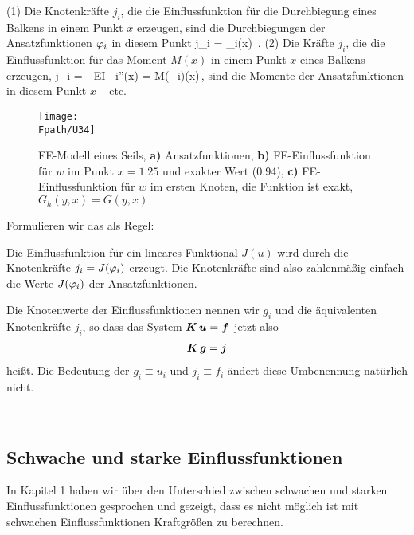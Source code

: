  (1) Die Knotenkr\"{a}fte $j_i$, die die Einflussfunktion f\"{u}r die Durchbiegung eines Balkens in einem Punkt $x$ erzeugen, sind die Durchbiegungen der Ansatzfunktionen $\varphi_i$ in diesem Punkt
\beq
j_i = \Np_i(x) \,.
\eeq
(2) Die Kr\"{a}fte $j_i$, die die Einflussfunktion f\"{u}r das Moment $M(x) $ in einem Punkt $x$ eines Balkens erzeugen,
\beq
j_i = - EI\,\Np_i''(x) = M(\Np_i)(x)\,,
\eeq
sind die Momente der Ansatzfunktionen in diesem Punkt $x$ -- etc.
\begin{figure}
\centering
{\texttt{[image: \\Fpath/U34]}}
\caption{FE-Modell eines Seils, \textbf{ a)} Ansatzfunktionen,  \textbf{ b)} FE-Einflussfunktion f\"{u}r $w$ im Punkt $x = 1.25$ und exakter Wert (0.94),  \textbf{ c)} FE-Einflussfunktion f\"{u}r $w$ im ersten Knoten, die Funktion ist exakt, $G_h(y,x) = G(y,x)$}
\label{U34}
%
\end{figure}%

Formulieren wir das als Regel:\\

\begin{theorem}
Die Einflussfunktion f\"{u}r ein lineares Funktional $J(u)$ wird durch die Knotenkr\"{a}fte $j_i = J(\varphi_i)$ erzeugt. Die Knotenkr\"{a}fte sind also zahlenm\"{a}{\ss}ig einfach die Werte $J(\varphi_i)$ der Ansatzfunktionen.
\end{theorem}

\hspace*{-12pt}\colorbox{highlightBlue}{\parbox{0.98\textwidth}{Die Knotenwerte der Einflussfunktionen nennen wir $g_i$ und die \"{a}quivalenten Knotenkr\"{a}fte $j_i$, so dass das System $\mbox{\boldmath $K$}\,\mbox{\boldmath $u$} = \mbox{\boldmath $f$}$ jetzt also
\begin{align}
\mbox{\boldmath $K$}\,\mbox{\boldmath $g$} = \mbox{\boldmath $j$}
\end{align}
hei{\ss}t. Die Bedeutung der $g_i \equiv u_i$ und $j_i \equiv f_i$ \"{a}ndert diese Umbenennung nat\"{u}rlich nicht.}}\\

{\textcolor{sectionTitleBlue}{\section{Schwache und starke Einflussfunktionen}}}
In Kapitel 1 haben wir \"{u}ber den Unterschied zwischen schwachen und starken Einflussfunktionen gesprochen und gezeigt, dass es nicht m\"{o}glich ist mit schwachen Einflussfunktionen Kraftgr\"{o}{\ss}en zu berechnen.

